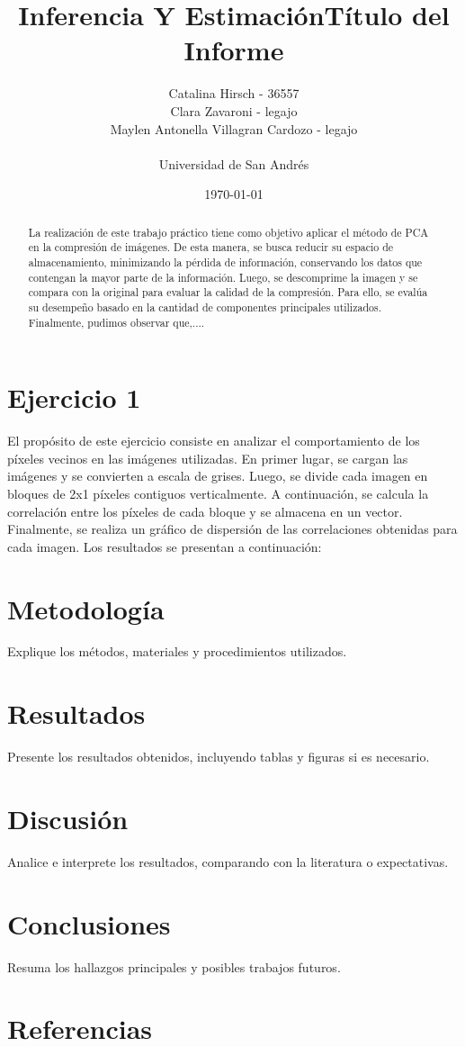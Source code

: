 \documentclass[a4paper,12pt]{article}
\title{Inferencia Y Estimación}
\title{Título del Informe}
\author{Catalina Hirsch - 36557 \\ Clara Zavaroni - legajo \\ Maylen Antonella Villagran Cardozo - legajo \\ \\ Universidad de San Andrés}
\date{\today}
\begin{document}
\maketitle

\begin{abstract}
La realización de este trabajo práctico tiene como objetivo aplicar el método de 
PCA en la compresión de imágenes. De esta manera, se busca reducir su espacio de almacenamiento,
minimizando la pérdida de información, conservando los datos que contengan la mayor parte de la información.
Luego, se descomprime la imagen y se compara con la original para evaluar la calidad de la compresión. 
Para ello, se evalúa su desempeño basado en la cantidad de componentes principales utilizados.
Finalmente, pudimos observar que,....
\end{abstract}

\section{Ejercicio 1}
El propósito de este ejercicio consiste en analizar el comportamiento de los píxeles vecinos en las imágenes utilizadas.
En primer lugar, se cargan las imágenes y se convierten a escala de grises. Luego, se divide cada imagen en bloques de 2x1 píxeles
contiguos verticalmente. A continuación, se calcula la correlación entre los píxeles de cada bloque y se almacena en un vector.
Finalmente, se realiza un gráfico de dispersión de las correlaciones obtenidas para cada imagen.
Los resultados se presentan a continuación:


\section{Metodología}
Explique los métodos, materiales y procedimientos utilizados.

\section{Resultados}
Presente los resultados obtenidos, incluyendo tablas y figuras si es necesario.

\section{Discusión}
Analice e interprete los resultados, comparando con la literatura o expectativas.

\section{Conclusiones}
Resuma los hallazgos principales y posibles trabajos futuros.

\section*{Referencias}


\end{document}
